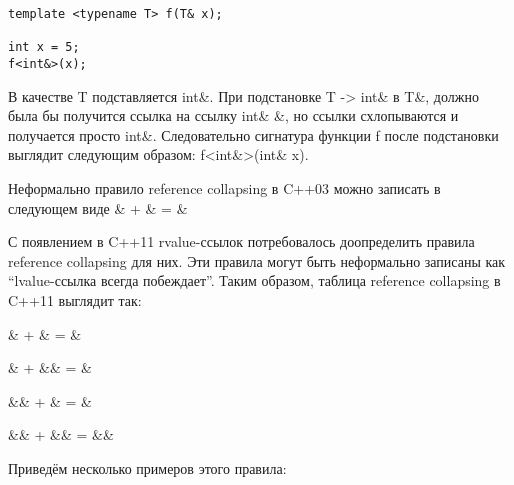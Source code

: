 \begin{verbatim}
template <typename T> f(T& x);

int x = 5;
f<int&>(x);
\end{verbatim}

В качестве T подставляется int\&. При подстановке T -> int\& в T\&,  должно была бы получится ссылка на ссылку int\& \&, но ссылки схлопываются и получается просто int\&. Следовательно сигнатура функции f после подстановки выглядит следующим образом: f<int\&>(int\& x).

Неформально правило reference collapsing в C++03 можно записать в следующем виде \& + \& = \&

С появлением в C++11 rvalue-ссылок потребовалось доопределить правила reference collapsing для них. Эти правила могут быть неформально записаны как “lvalue-ссылка всегда побеждает”. Таким образом, таблица reference collapsing в C++11 выглядит так:

\& + \& = \&

\& + \&\& = \&

\&\& + \& = \&

\&\& + \&\& = \&\&

Приведём несколько примеров этого правила:

